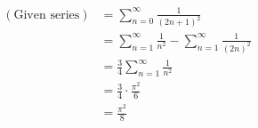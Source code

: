 \item

\begin{align*}
	(\text{Given series})
	&= \sum_{n = 0}^\infty \frac{1}{{(2n + 1)}^2} \\
	&= \sum_{n = 1}^\infty \frac{1}{n^2} - \sum_{n = 1}^\infty \frac{1}{{(2n)}^2} \\
	&= \frac{3}{4} \sum_{n = 1}^\infty \frac{1}{n^2} \\
	&= \frac{3}{4} \cdot \frac{\pi^2}{6} \\
	&= \frac{\pi^2}{8}
\end{align*}
